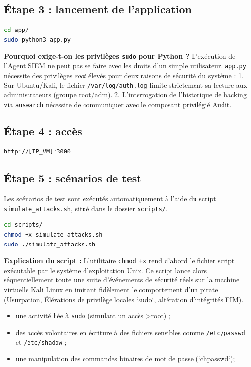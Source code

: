 \documentclass[12pt,a4paper]{article}
\begin{document}
\subsection{Étape 3 : lancement de l’application}

\begin{lstlisting}[language=bash]
cd app/
sudo python3 app.py
\end{lstlisting}

\textbf{Pourquoi exige-t-on les privilèges \texttt{sudo} pour Python ?}
L'exécution de l'Agent SIEM ne peut pas se faire avec les droits d'un simple utilisateur. \texttt{app.py} nécessite des privilèges \textit{root} élevés pour deux raisons de sécurité du système :
1. Sur Ubuntu/Kali, le fichier \texttt{/var/log/auth.log} limite strictement sa lecture aux administrateurs (groupe root/adm).
2. L'interrogation de l'historique de hacking via \texttt{ausearch} nécessite de communiquer avec le composant privilégié Audit.

\subsection{Étape 4 : accès}

\begin{lstlisting}
http://[IP_VM]:3000
\end{lstlisting}

\subsection{Étape 5 : scénarios de test}

Les scénarios de test sont exécutés automatiquement à l’aide du script \texttt{simulate\_attacks.sh}, situé dans le dossier \texttt{scripts/}.

\begin{lstlisting}[language=bash]
cd scripts/
chmod +x simulate_attacks.sh
sudo ./simulate_attacks.sh
\end{lstlisting}

\textbf{Explication du script :}
L'utilitaire \texttt{chmod +x} rend d'abord le fichier script exécutable par le système d'exploitation Unix.
Ce script lance alors séquentiellement toute une suite d'événements de sécurité réels sur la machine virtuelle Kali Linux en imitant fidèlement le comportement d'un pirate (Usurpation, Élévations de privilège locales `sudo`, altération d'intégrités FIM).
\begin{itemize}
    \item une activité liée à \texttt{sudo} (simulant un accès \textgreater root) ;
    \item des accès volontaires en écriture à des fichiers sensibles comme \texttt{/etc/passwd} et \texttt{/etc/shadow} ;
    \item une manipulation des commandes binaires de mot de passe (`chpasswd`);
\end{itemize}
\end{document}
